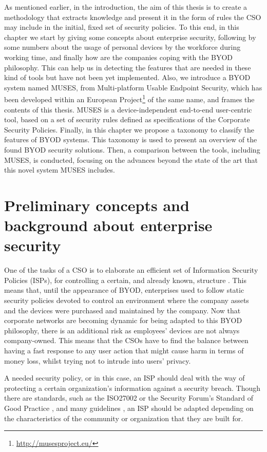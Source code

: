 As mentioned earlier, in the introduction, the aim of this thesis is to create a methodology that extracts knowledge and present it in the form of rules the CSO may include in the initial, fixed set of security policies. To this end, in this chapter we start by giving some concepts about enterprise security, following by some numbers about the usage of personal devices by the workforce during working time, and finally how are the companies coping with the BYOD philosophy. This can help us in detecting the features that are needed in these kind of tools but have not been yet implemented. Also, we introduce a BYOD system named MUSES, from Multi-platform Usable Endpoint Security, which has been developed within an European Project\footnote{\url{http://musesproject.eu/}} of the same name, and frames the contents of this thesis. MUSES is a dev\-ice\--in\-de\-pen\-dent end-to-end user-centric tool, based on a set of security rules defined as specifications of the Corporate Security Policies. Finally, in this chapter we propose a taxonomy to classify the features of BYOD systems. This taxonomy is used to present an overview of the found BYOD security solutions. Then, a comparison between the tools, including MUSES, is conducted, focusing on the advances beyond the state of the art that this novel system MUSES includes.

\section{Preliminary concepts and background about enterprise security}
\label{sec:preliminaryconcepts}

One of the tasks of a CSO is to elaborate an efficient set of Information Security Policies (ISPs), for controlling a certain, and already known, structure \cite{Opp_Security11}. This means that, until the appearance of BYOD, enterprises used to follow static security policies devoted to control an environment where the company assets and the devices were purchased and maintained by the company. Now that corporate networks are becoming dynamic for being adapted to this BYOD philosophy, there is an additional risk as employees' devices are not always company-owned. This means that the CSOs have to find the balance between having a fast response to any user action that might cause harm in terms of money loss, whilst trying not to intrude into users' privacy.

A needed security policy, or in this case, an ISP should deal with the way of protecting a certain organization's information against a security breach. Though there are standards, such as the ISO27002 or the Security Forum's Standard of Good Practice \cite{iso27002_isf}, and many guidelines \cite{SecPol09}, an ISP should be adapted depending on the characteristics of the community or organization that they are built for.


